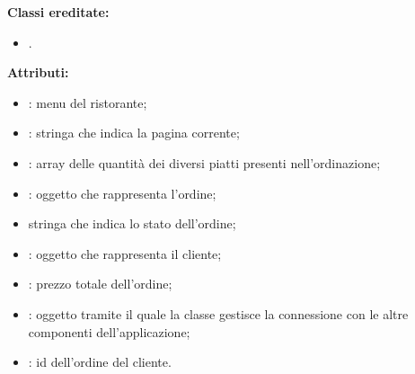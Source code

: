 \textbf{Classi ereditate:}
\begin{itemize}
	\item {}.
\end{itemize}


\textbf{Attributi:}
\begin{itemize}
	\item {}: menu del ristorante;
	\item {}: stringa che indica la pagina corrente;
	\item {}: array delle quantità dei diversi piatti presenti nell'ordinazione;
	\item {}: oggetto che rappresenta l'ordine;
	\item {} stringa che indica lo stato dell'ordine;
	\item {}: oggetto che rappresenta il cliente;
	\item {}: prezzo totale dell'ordine;
	\item {}: oggetto tramite il quale la classe gestisce la connessione con le altre componenti dell'applicazione;
	\item {}: id dell'ordine del cliente.
\end{itemize}

